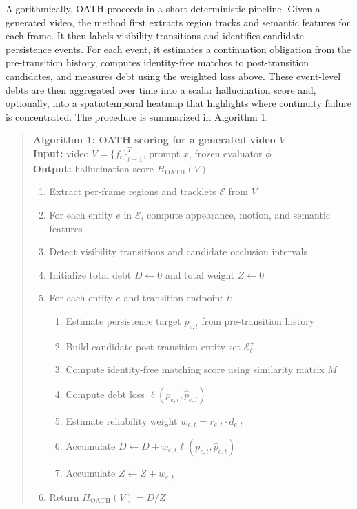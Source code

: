 \documentclass{article}
\begin{document}
Algorithmically, OATH proceeds in a short deterministic pipeline. Given a generated video, the method first extracts region tracks and semantic features for each frame. It then labels visibility transitions and identifies candidate persistence events. For each event, it estimates a continuation obligation from the pre-transition history, computes identity-free matches to post-transition candidates, and measures debt using the weighted loss above. These event-level debts are then aggregated over time into a scalar hallucination score and, optionally, into a spatiotemporal heatmap that highlights where continuity failure is concentrated. The procedure is summarized in Algorithm 1.

\begin{quote}
\textbf{Algorithm 1: OATH scoring for a generated video \(V\)}\\
\textbf{Input:} video \(V = \{f_t\}_{t=1}^T\), prompt \(x\), frozen evaluator \(\phi\)\\
\textbf{Output:} hallucination score \(H_{\mathrm{OATH}}(V)\)

\begin{enumerate}
    \item Extract per-frame regions and tracklets \(\mathcal{E}\) from \(V\)
    \item For each entity \(e\) in \(\mathcal{E}\), compute appearance, motion, and semantic features
    \item Detect visibility transitions and candidate occlusion intervals
    \item Initialize total debt \(D \leftarrow 0\) and total weight \(Z \leftarrow 0\)
    \item For each entity \(e\) and transition endpoint \(t\):
    \begin{enumerate}
        \item Estimate persistence target \(p_{e,t}\) from pre-transition history
        \item Build candidate post-transition entity set \(\mathcal{E}_t^+\)
        \item Compute identity-free matching score using similarity matrix \(M\)
        \item Compute debt loss \(\ell(p_{e,t}, \hat{p}_{e,t})\)
        \item Estimate reliability weight \(w_{e,t} = r_{e,t} \cdot d_{e,t}\)
        \item Accumulate \(D \leftarrow D + w_{e,t} \ell(p_{e,t}, \hat{p}_{e,t})\)
        \item Accumulate \(Z \leftarrow Z + w_{e,t}\)
    \end{enumerate}
    \item Return \(H_{\mathrm{OATH}}(V) = D / Z\)
\end{enumerate}
\end{quote}
\end{document}
